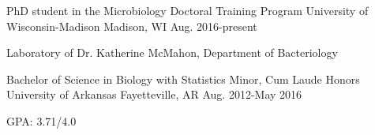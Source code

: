 
\begin{cventries}
  \cventry
    {PhD student in the Microbiology Doctoral Training Program} %
    {University of Wisconsin-Madison} %
    {Madison, WI} %
    {Aug. 2016-present} %
    {
      \begin{cvitems} %
        \item {Laboratory of Dr. Katherine McMahon, Department of Bacteriology}
      \end{cvitems}
    }
\cventry
    {Bachelor of Science in Biology with Statistics Minor, Cum Laude Honors} %
    {University of Arkansas} %
    {Fayetteville, AR} %
    {Aug. 2012-May 2016} %
    {
     \begin{cvitems} %
        \item{GPA: 3.71/4.0}
      \end{cvitems}
    }
\end{cventries}

